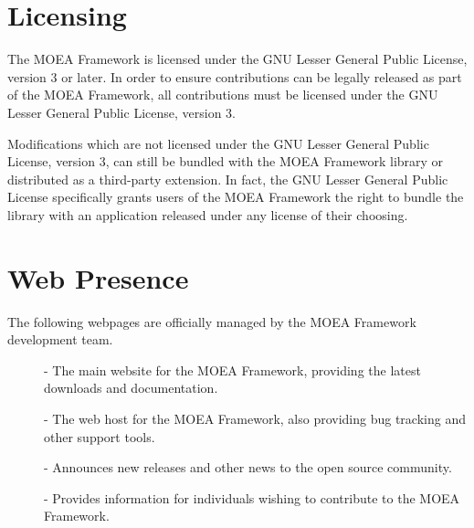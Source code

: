 \section{Licensing}
The MOEA Framework is licensed under the GNU Lesser General Public License, version 3 or later.  In order to ensure contributions can be legally released as part of the MOEA Framework, all contributions must be licensed under the GNU Lesser General Public License, version 3.

Modifications which are not licensed under the GNU Lesser General Public License, version 3, can still be bundled with the MOEA Framework library or distributed as a third-party extension.  In fact, the GNU Lesser General Public License specifically grants users of the MOEA Framework the right to bundle the library with an application released under any license of their choosing.

\section{Web Presence}
The following webpages are officially managed by the MOEA Framework development team.

\begin{description}
  \item[] - The main website for the MOEA Framework, providing the latest downloads and documentation.
  \item[] - The web host for the MOEA Framework, also providing bug tracking and other support tools.
  \item[] - Announces new releases and other news to the open source community.
  \item[] - Provides information for individuals wishing to contribute to the MOEA Framework.
\end{description}